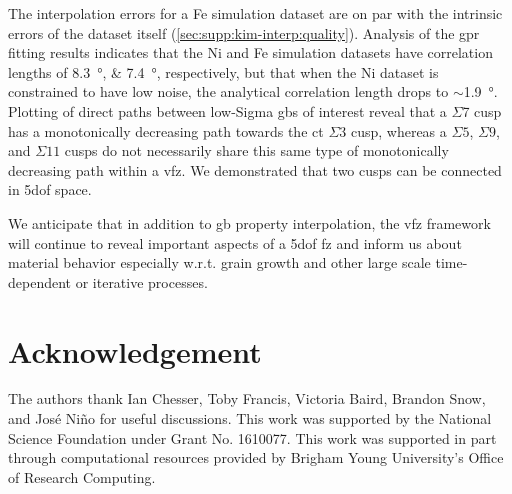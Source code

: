 \documentclass[final,twocolumn,12pt]{elsarticle}
\begin{document}
	The interpolation errors for a Fe simulation dataset are on par with the intrinsic errors of the dataset itself (\cref{sec:supp:kim-interp:quality}). %
	Analysis of the \gls{gpr} fitting results indicates that the Ni and Fe simulation datasets have correlation lengths of \SIlist{8.3;7.4}{\degree}, respectively, but that when the Ni dataset is constrained to have low noise, the analytical correlation length drops to $\sim$\SI{1.9}{\degree}. %
	Plotting of direct paths between low-Sigma \glspl{gb} of interest reveal that a $\Sigma$7 cusp has a monotonically decreasing path towards the \gls{ct} $\Sigma3$ cusp, whereas a $\Sigma5$, $\Sigma9$, and $\Sigma11$ cusps do not necessarily share this same type of monotonically decreasing path within a \gls{vfz}. We demonstrated that two cusps can be connected in \gls{5dof} space.
	
	We anticipate that in addition to \gls{gb} property interpolation, the \gls{vfz} framework will continue to reveal important aspects of a \gls{5dof} \gls{fz} and inform us about material behavior especially w.r.t. grain growth and other large scale time-dependent or iterative processes.
	\section*{Acknowledgement}
	\label{sec:acknowledgement}
	
	The authors thank Ian Chesser, Toby Francis, Victoria Baird, Brandon Snow, and José Niño for useful discussions. This work was supported by the National Science Foundation under Grant No. 1610077. This work was supported in part through computational resources provided by Brigham Young University's Office of Research Computing.
\end{document}
